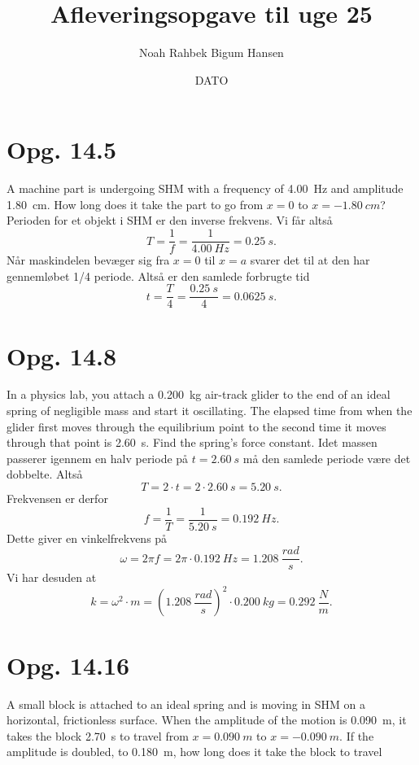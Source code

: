 \documentclass[12pt]{article}
\title{Afleveringsopgave til uge 25}
\author{Noah Rahbek Bigum Hansen}
\date{DATO}
\theoremstyle{definition}
\begin{document}
\maketitle

\section*{Opg. 14.5}
A machine part is undergoing SHM with a frequency of \qty{4,00}{Hz} and amplitude \qty{1,80}{cm}. How long does it take the part to go from $x = 0$ to $x = -\qty{1,80}{cm}$?
\bigbreak
Perioden for et objekt i SHM er den inverse frekvens. Vi får altså
\[ 
T = \frac{1}{f} = \frac{1}{\qty{4,00}{Hz}} = \qty{0,25}{s} 
.\]
Når maskindelen bevæger sig fra $x = 0$ til $x = a$ svarer det til at den har gennemløbet 1/4 periode. Altså er den samlede forbrugte tid
\[ 
t = \frac{T}{4} = \frac{\qty{0,25}{s}}{4} = \qty{0,0625}{s} 
.\]




\section*{Opg. 14.8}
In a physics lab, you attach a \qty{0,200}{kg} air-track glider to the end of an ideal spring of negligible mass and start it oscillating. The elapsed time from when the glider first moves through the equilibrium point to the second time it moves through that point is \qty{2,60}{s}. Find the spring’s force constant.
\bigbreak
Idet massen passerer igennem en halv periode på $t =\qty{2,60}{s}$ må den samlede periode være det dobbelte. Altså
\[ 
T = 2\cdot t = 2\cdot \qty{2,60}{s} = \qty{5,20}{s} 
.\]
Frekvensen er derfor
\[ 
  f = \frac{1}{T} = \frac{1}{\qty{5,20}{s}} = \qty{0,192}{Hz} 
.\]
Dette giver en vinkelfrekvens på
\[ 
\omega = 2\pi f = 2 \pi \cdot \qty{0,192}{Hz} = \qty{1,208}{\frac{rad}{s}} 
.\]
Vi har desuden at
\[ 
  k = \omega^2 \cdot m = \left( \qty{1,208}{\frac{rad}{s}}  \right)^2 \cdot \qty{0,200}{kg} = \qty{0,292}{\frac{N}{m}} 
.\]



\section*{Opg. 14.16}
A small block is attached to an ideal spring and is moving in SHM on a horizontal, frictionless surface. When the amplitude of the motion is \qty{0,090}{m}, it takes the block \qty{2,70}{s} to travel from $x = \qty{0,090}{m}$ to $x = - \qty{0,090}{m}$. If the amplitude is doubled, to \qty{0,180}{m}, how long does it take the block to travel
\end{document}

